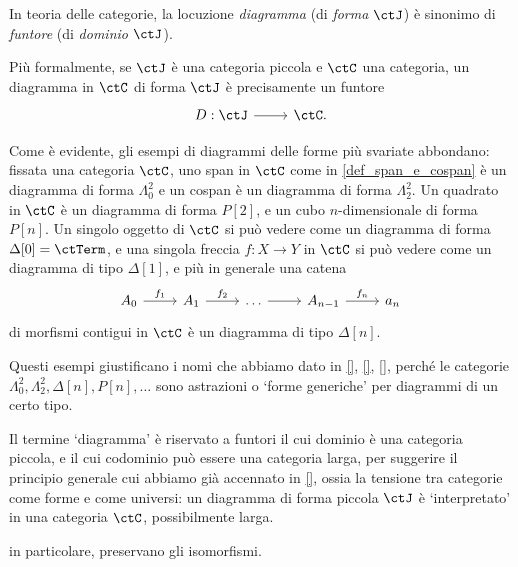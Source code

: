\begin{example}
\end{example}
\begin{example}
\end{example}
\begin{example}
\end{example}
\begin{definition}\label{def_diagramma_comm}
  In teoria delle categorie, la locuzione \emph{diagramma} (di \emph{forma} $\ctJ$) è sinonimo di \emph{funtore} (di \emph{dominio} $\ctJ$).

  Più formalmente, se $\ctJ$ è una categoria piccola e $\ctC$ una categoria, un diagramma in $\ctC$ di forma $\ctJ$ è precisamente un funtore 
  \[\begin{tikzcd}
  D : \ctJ \ar[r] & \ctC.
\end{tikzcd}
\]
\end{definition}
\begin{remark}
Come è evidente, gli esempi di diagrammi delle forme più svariate abbondano: fissata una categoria $\ctC$, uno span in $\ctC$ come in \ref{def_span_e_cospan} è un diagramma di forma $\Lambda^2_0$ e un cospan è un diagramma di forma $\Lambda^2_2$. Un quadrato in $\ctC$ è un diagramma di forma $P[2]$, e un cubo $n$-dimensionale di forma $P[n]$. Un singolo oggetto di $\ctC$ si può vedere come un diagramma di forma $\Delta[0]=\ctTerm$, e una singola freccia $f : X\to Y$ in $\ctC$ si può vedere come un diagramma di tipo $\Delta[1]$, e più in generale una catena 
\[\begin{tikzcd}
  A_0 \ar[r, "f_1"] & A_1 \ar[r, "f_2"] & \dots \ar[r] & A_{n-1} \ar[r, "f_n"] & a_n
\end{tikzcd}
\]
di morfismi contigui in $\ctC$ è un diagramma di tipo $\Delta[n]$.

Questi esempi giustificano i nomi che abbiamo dato in \ref{}, \ref{}, \ref{}, perché le categorie $\Lambda^2_0,\Lambda^2_2,\Delta[n], P[n], \dots$  sono astrazioni o `forme generiche' per diagrammi di un certo tipo.
\end{remark}
\begin{remark}
  Il termine `diagramma' è riservato a funtori il cui dominio è una categoria piccola, e il cui codominio può essere una categoria larga, per suggerire il principio generale cui abbiamo già accennato in \ref{}, ossia la tensione tra categorie come forme e come universi: un diagramma di forma piccola $\ctJ$ è `interpretato' in una categoria $\ctC$, possibilmente larga.
\end{remark}
\Todo{}
\begin{lemma}\label{lem_funtori_preservano_comm}
	 in particolare, preservano gli isomorfismi.
\end{lemma}

